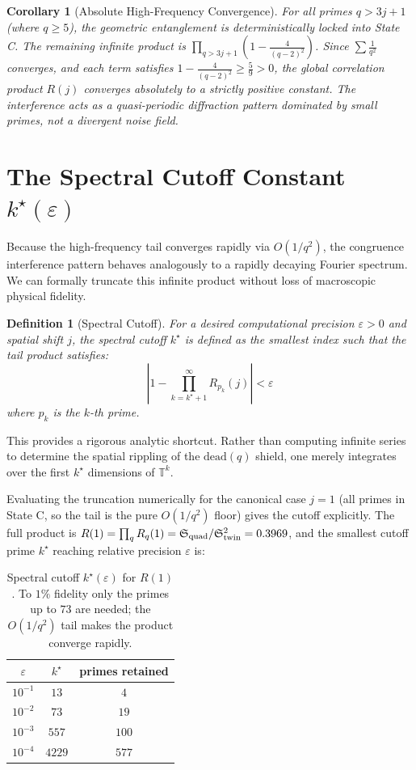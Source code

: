 \documentclass[11pt,a4paper]{article}
\newtheorem{corollary}{Corollary}
\newtheorem{definition}{Definition}
\begin{document}
\begin{corollary}[Absolute High-Frequency Convergence]
For all primes $q > 3j+1$ (where $q \ge 5$), the geometric entanglement is deterministically locked into State C. The remaining infinite product is $\prod_{q > 3j+1} \left(1 - \frac{4}{(q-2)^2}\right)$. Since $\sum \frac{1}{q^2}$ converges, and each term satisfies $1 - \frac{4}{(q-2)^2} \ge \frac{5}{9} > 0$, the global correlation product $R(j)$ converges absolutely to a strictly positive constant. The interference acts as a quasi-periodic diffraction pattern dominated by small primes, not a divergent noise field.
\end{corollary}

\section{The Spectral Cutoff Constant $k^\star(\varepsilon)$}

Because the high-frequency tail converges rapidly via $O(1/q^2)$, the congruence interference pattern behaves analogously to a rapidly decaying Fourier spectrum. We can formally truncate this infinite product without loss of macroscopic physical fidelity.

\begin{definition}[Spectral Cutoff]
For a desired computational precision $\varepsilon > 0$ and spatial shift $j$, the spectral cutoff $k^\star$ is defined as the smallest index such that the tail product satisfies:
\begin{equation}
\left| 1 - \prod_{k = k^\star + 1}^{\infty} R_{p_k}(j) \right| < \varepsilon
\end{equation}
where $p_k$ is the $k$-th prime.
\end{definition}
This provides a rigorous analytic shortcut. Rather than computing infinite series to determine the spatial rippling of the $\mathrm{dead}(q)$ shield, one merely integrates over the first $k^\star$ dimensions of $\mathbb{T}^k$.

Evaluating the truncation numerically for the canonical case $j=1$ (all primes in State C, so the tail is the pure $O(1/q^2)$ floor) gives the cutoff explicitly. The full product is $R(1)=\prod_q R_q(1)=\mathfrak{S}_{\rm quad}/\mathfrak{S}_{\rm twin}^2=0.3969$, and the smallest cutoff prime $k^\star$ reaching relative precision $\varepsilon$ is:

\begin{table}[h]\centering
\begin{tabular}{ccc}
\hline
$\varepsilon$ & $k^\star$ & primes retained\\
\hline
$10^{-1}$ & $13$ & $4$\\
$10^{-2}$ & $73$ & $19$\\
$10^{-3}$ & $557$ & $100$\\
$10^{-4}$ & $4229$ & $577$\\
\hline
\end{tabular}
\caption{Spectral cutoff $k^\star(\varepsilon)$ for $R(1)$. To $1\%$ fidelity only
the primes up to $73$ are needed; the $O(1/q^2)$ tail makes the product converge
rapidly.}
\label{tab:kstar}
\end{table}
\end{document}

